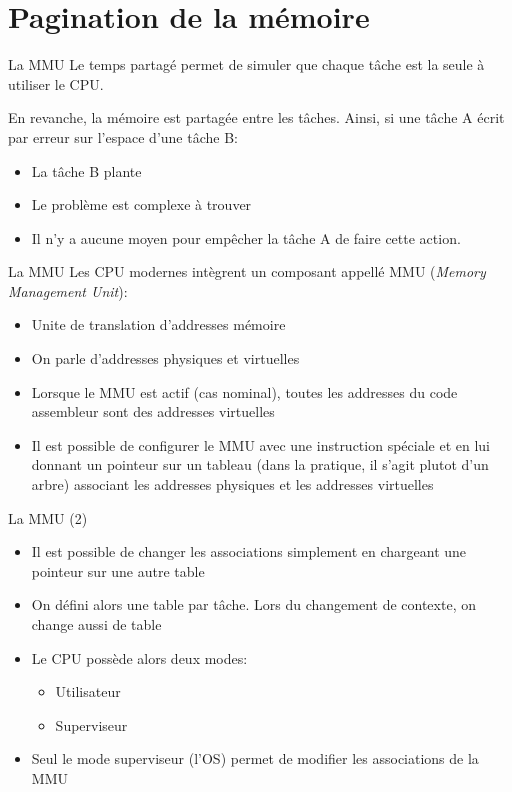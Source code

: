 \section{Pagination de la mémoire}

\begin{frame}{La MMU}
  Le temps partagé  permet de simuler que chaque tâche  est la seule à
  utiliser le CPU.

  En revanche, la mémoire est partagée entre les tâches. Ainsi, si une
  tâche A écrit par erreur sur l'espace d'une tâche B:
  \begin{itemize} 
  \item  La tâche B plante
  \item  Le problème est complexe à trouver
  \item Il  n'y a  aucune moyen  pour empêcher la  tâche A  de faire
    cette action.
  \end{itemize} 
\end{frame}

\begin{frame}{La MMU}  
  Les  CPU  modernes  intègrent   un  composant  appellé  MMU  (\emph{Memory
  Management Unit}):
  \begin{itemize}
  \item  Unite de translation d'addresses mémoire
  \item  On parle d'addresses physiques et virtuelles
  \item Lorsque le  MMU est actif (cas nominal),  toutes les addresses
    du code assembleur sont des addresses virtuelles
  \item  Il est  possible de  configurer le  MMU avec  une instruction
    spéciale et  en lui  donnant un pointeur  sur un tableau  (dans la
    pratique,  il s'agit  plutot d'un  arbre) associant  les addresses
    physiques et les addresses virtuelles
  \end{itemize}
\end{frame}

\begin{frame}{La MMU (2)}  
  \begin{itemize} 
  \item  Il est  possible  de changer  les  associations simplement  en
    chargeant une pointeur sur une autre table
  \item On  défini alors une table  par tâche.  Lors  du changement de
    contexte, on change aussi de table
  \item Le CPU possède alors deux modes:
    \begin{itemize}
    \item  Utilisateur
    \item  Superviseur
    \end{itemize} 
  \item  Seul  le  mode  superviseur  (l'OS) permet  de  modifier  les
    associations de la MMU
  \end{itemize}
\end{frame} 

